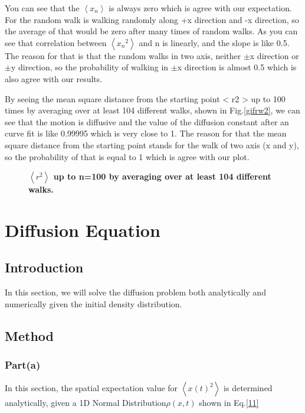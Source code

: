 \documentclass[11pt, oneside]{article}  	%
\begin{document}
You can see that the $\left \langle x_n \right\rangle$ is always zero which is agree with our expectation. For the random walk is walking randomly along +x direction and -x direction, so the average of that would be zero after many times of random walks. As you can see that correlation between $\left \langle {x_n}^2 \right\rangle$ and n is linearly, and the slope is like 0.5. The reason for that is that the random walks in two axis, neither $\pm$x direction or $\pm$y direction, so the probability of walking in $\pm$x direction is almost 0.5 which is also agree with our results.

By seeing the mean square distance from the starting point < r2 > up to 100 times by averaging over at least 104 different walks, shown in Fig.\ref{gifrw2}, we can see that the motion is diffusive and the value of the diffusion constant after an curve fit is like 0.99995 which is very close to 1. The reason for that the mean square distance from the starting point stands for the walk of two axis (x and y), so the probability of that is equal to 1 which is agree with our plot.
  
\begin{figure}[h]
\begin{center}
\caption{{\bf $\left \langle r^2 \right\rangle$ up to n=100 by averaging over at least 104 different walks. }}
\label{figrw1}
\end{center}
\end{figure}


\section{Diffusion Equation}
\subsection{Introduction}
In this section, we will solve the diffusion problem both analytically and numerically given the initial density distribution.
\subsection{Method}
\subsubsection{Part(a)}
In this section, the spatial expectation value for $\left \langle x(t)^2 \right\rangle$ is determined analytically, given a 1D Normal Distribution$\rho(x,t)$ shown in Eq.\eqref{11}
\end{document}
